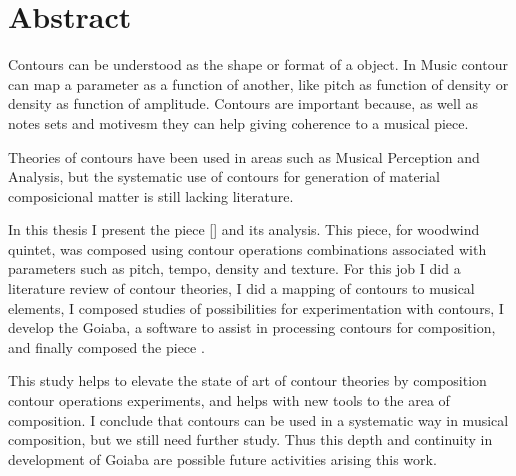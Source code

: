 \chapter*{Abstract}
\label{cha:abstract}

Contours can be understood as the shape or format of a object. In
Music contour can map a parameter as a function of another, like pitch
as function of density or density as function of amplitude. Contours
are important because, as well as notes sets and motivesm they can
help giving coherence to a musical piece.

Theories of contours have been used in areas such as Musical
Perception and Analysis, but the systematic use of contours for
generation of material composicional matter is still lacking
literature.

In this thesis I present the piece \obra{} [] and its analysis. This piece, for woodwind quintet,
was composed using contour operations combinations associated with
parameters such as pitch, tempo, density and texture. For this job I
did a literature review of contour theories, I did a mapping of
contours to musical elements, I composed studies of possibilities for
experimentation with contours, I develop the Goiaba, a software to
assist in processing contours for composition, and finally composed
the piece \obra{}.

This study helps to elevate the state of art of contour theories by
composition contour operations experiments, and helps with new tools
to the area of composition.
I conclude that contours can be used in a systematic way in musical
composition, but we still need further study. Thus this depth and
continuity in development of Goiaba are possible future activities
arising this work.
